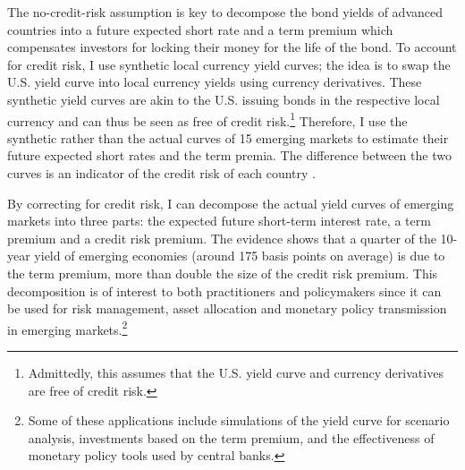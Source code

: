 {%
The no-credit-risk assumption is key to decompose the bond yields of advanced countries into a future expected short rate and a term premium which compensates investors for locking their money for the life of the bond. 
To account for credit risk, I use synthetic local currency yield curves; the idea is to swap the U.S. yield curve into local currency yields using
currency derivatives.
These synthetic yield curves are akin to the U.S. issuing bonds in the respective local currency and can thus be seen as free of credit risk.\footnote{ Admittedly, this assumes that the U.S. yield curve and currency derivatives are free of credit risk.}
Therefore, I use the synthetic rather than the actual curves of 15 emerging markets to estimate their future expected short rates and the term premia. The difference between the two curves
is an indicator of the credit risk of each country \citep{DuSchreger:2016JoF}.

By correcting for credit risk, I can decompose the actual yield curves of emerging markets into three parts: the expected future short-term interest rate, a term premium and a credit risk premium. 
The evidence shows that a quarter of the 10-year yield of emerging economies (around 175 basis points on average) is due to the term premium, more than double the size of the credit risk premium. 
This decomposition is of interest to both practitioners and policymakers since it can be used for risk management, asset allocation and monetary policy transmission in emerging markets.\footnote{ Some of these applications include simulations of the yield curve for scenario analysis, investments based on the term premium, and the effectiveness of monetary policy tools used by central banks.}

}
